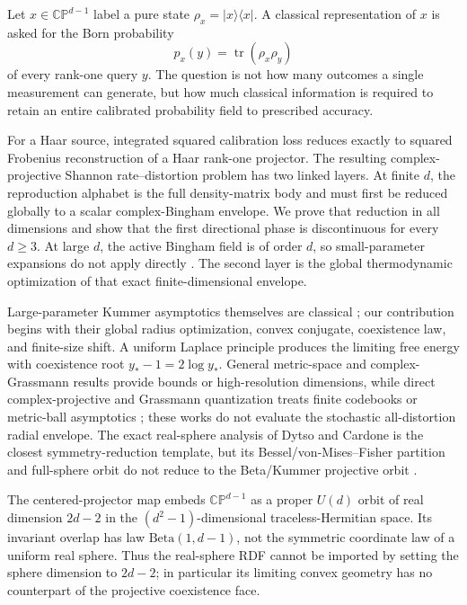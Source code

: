 \documentclass[11pt,a4paper]{article}
\theoremstyle{remark}
\newcommand{\CP}{\mathbb{CP}}
\newcommand{\Tr}{\operatorname{tr}}
\begin{document}
Let $x\in\CP^{d-1}$ label a pure state
$\rho_x=|x\rangle\langle x|$.  A classical representation of $x$ is asked
for the Born probability
\begin{equation}
 p_x(y)=\Tr(\rho_x\rho_y)
 \label{eq:born-field}
\end{equation}
of every rank-one query $y$.  The question is not how many outcomes a single
measurement can generate, but how much classical information is required to
retain an entire calibrated probability field to prescribed accuracy.

For a Haar source, integrated squared calibration loss reduces exactly to
squared Frobenius reconstruction of a Haar rank-one projector.  The resulting
complex-projective Shannon rate--distortion problem has two linked layers.
At finite $d$, the reproduction alphabet is the full density-matrix body and
must first be reduced globally to a scalar complex-Bingham envelope.  We prove
that reduction in all dimensions and show that the first directional phase is
discontinuous for every $d\ge3$.  At large $d$, the active Bingham field is of
order $d$, so small-parameter expansions do not apply directly
\cite{BagyanRichards2023}.  The second layer is the global thermodynamic
optimization of that exact finite-dimensional envelope.

Large-parameter
Kummer asymptotics themselves are classical
\cite{Temme1978Kummer,LopezPagola2010Kummer}; our contribution begins with
their global radius optimization, convex conjugate, coexistence law, and
finite-size shift.  A uniform Laplace principle produces the limiting free
energy with coexistence root $y_*-1=2\log y_*$.  General metric-space and
complex-Grassmann results provide bounds or high-resolution dimensions, while
direct complex-projective and Grassmann quantization treats finite codebooks
or metric-ball asymptotics
\cite{MondalDuttaHeath2006,DaiLiuRider2008,PitavalEtAl2016,RieglerKolianderBolcskei2023};
these works do not evaluate the stochastic all-distortion radial envelope.
The exact real-sphere analysis of Dytso and Cardone is the closest
symmetry-reduction template, but its Bessel/von-Mises--Fisher partition and
full-sphere orbit do not reduce to the Beta/Kummer projective orbit
\cite{DytsoCardone2024}.

The centered-projector map embeds $\CP^{d-1}$ as a proper $U(d)$ orbit of real
dimension $2d-2$ in the $(d^2-1)$-dimensional traceless-Hermitian space.  Its
invariant overlap has law $\mathrm{Beta}(1,d-1)$, not the symmetric coordinate
law of a uniform real sphere.  Thus the real-sphere RDF cannot be imported by
setting the sphere dimension to $2d-2$; in particular its limiting convex
geometry has no counterpart of the projective coexistence face.
\end{document}
